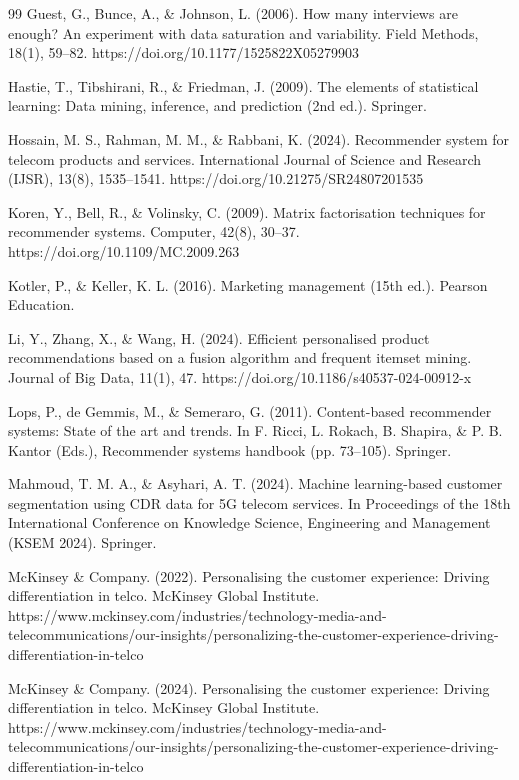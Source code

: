\begin{thebibliography}{99}
Guest, G., Bunce, A., \& Johnson, L. (2006). How many interviews are enough? An experiment with data saturation and variability. Field Methods, 18(1), 59--82. https://doi.org/10.1177/1525822X05279903

Hastie, T., Tibshirani, R., \& Friedman, J. (2009). The elements of statistical learning: Data mining, inference, and prediction (2nd ed.). Springer.

Hossain, M. S., Rahman, M. M., \& Rabbani, K. (2024). Recommender system for telecom products and services. International Journal of Science and Research (IJSR), 13(8), 1535--1541. https://doi.org/10.21275/SR24807201535

Koren, Y., Bell, R., \& Volinsky, C. (2009). Matrix factorisation techniques for recommender systems. Computer, 42(8), 30--37. https://doi.org/10.1109/MC.2009.263

Kotler, P., \& Keller, K. L. (2016). Marketing management (15th ed.). Pearson Education.

Li, Y., Zhang, X., \& Wang, H. (2024). Efficient personalised product recommendations based on a fusion algorithm and frequent itemset mining. Journal of Big Data, 11(1), 47. https://doi.org/10.1186/s40537-024-00912-x

Lops, P., de Gemmis, M., \& Semeraro, G. (2011). Content-based recommender systems: State of the art and trends. In F. Ricci, L. Rokach, B. Shapira, \& P. B. Kantor (Eds.), Recommender systems handbook (pp. 73--105). Springer.

Mahmoud, T. M. A., \& Asyhari, A. T. (2024). Machine learning-based customer segmentation using CDR data for 5G telecom services. In Proceedings of the 18th International Conference on Knowledge Science, Engineering and Management (KSEM 2024). Springer.

McKinsey \& Company. (2022). Personalising the customer experience: Driving differentiation in telco. McKinsey Global Institute. https://www.mckinsey.com/industries/technology-media-and-telecommunications/our-insights/personalizing-the-customer-experience-driving-differentiation-in-telco

McKinsey \& Company. (2024). Personalising the customer experience: Driving differentiation in telco. McKinsey Global Institute. https://www.mckinsey.com/industries/technology-media-and-telecommunications/our-insights/personalizing-the-customer-experience-driving-differentiation-in-telco


\end{thebibliography}
